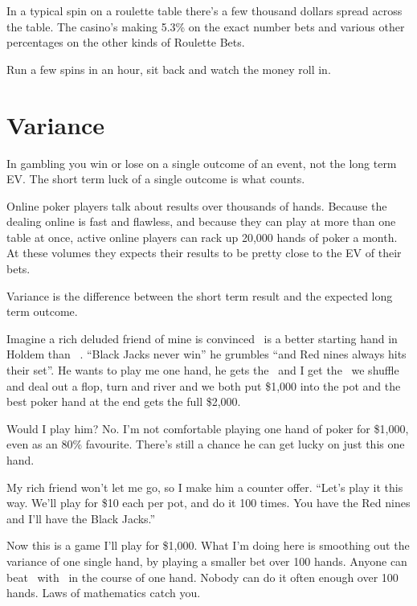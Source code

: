 
In a typical spin on a roulette table there's a few thousand dollars
spread across the table. The casino's making 5.3\% on the exact number
bets and various other percentages on the other kinds of Roulette Bets.

Run a few spins in an hour, sit back and watch the money roll in.

\section{Variance}

In gambling you win or lose on a single outcome of an event,
not the long term EV. The short term luck of a single outcome
is what counts.

Online poker players talk about results over thousands of hands. Because the
dealing online is fast and flawless, and because they can play at
more than one table at once, active online players can rack up
20,000 hands of poker a month. At these volumes they expects their
results to be pretty close to the EV of their bets.

Variance is the difference between the short term result and the
expected long term outcome.

Imagine a rich deluded friend of mine is convinced \nineh\nined\ is a better
starting hand in Holdem than \Jc\Js\ . ``Black Jacks never win'' he grumbles
``and Red nines always hits their set''. He wants to play me one hand, he
gets the \nineh\nined\ and I get the \Jc\Js\, we shuffle and deal out a flop,
turn and river and we both put \$1,000 into the pot and the best
poker hand at the end gets the full \$2,000.

Would I play him? No. I'm not comfortable playing one hand of poker
for \$1,000, even as an 80\% favourite. There's still a chance he can get
lucky on just this one hand.

My rich friend won't let me go, so I make him a counter offer.
``Let's play it this way. We'll play for \$10 each per pot, and do
it 100 times. You have the Red nines and I'll have the Black Jacks.''

Now this is a game I'll play for \$1,000. What I'm doing here is smoothing
out the variance of one single hand, by playing a smaller bet over
100 hands. Anyone can beat \Jc\Js\ with \nineh\nined\ in the course of one
hand. Nobody can do it often enough over 100 hands. Laws of mathematics
catch you.

